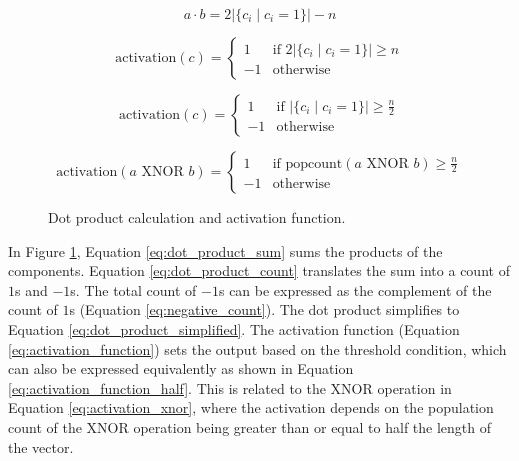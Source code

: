 \documentclass[conference]{IEEEtran}
\begin{document}
\begin{figure}[t]
    \begin{equation}
    a \cdot b = 2 \left|\{c_i \mid c_i = 1\}\right| - n
    \label{eq:dot_product_simplified}
    \end{equation}

    \begin{equation}
    \text{activation}(c) = \begin{cases}
    1 & \text{if } 2 \left|\{c_i \mid c_i = 1\}\right| \geq n \\
    -1 & \text{otherwise}
    \end{cases}
    \label{eq:activation_function}
    \end{equation}

    \begin{equation}
    \text{activation}(c) = \begin{cases}
    1 & \text{if } \left|\{c_i \mid c_i = 1\}\right| \geq \frac{n}{2} \\
    -1 & \text{otherwise}
    \end{cases}
    \label{eq:activation_function_half}
    \end{equation}

    \begin{equation}
    \text{activation}(a \text{ XNOR } b) = \begin{cases}
    1 & \text{if } \text{popcount}(a \text{ XNOR } b) \geq \frac{n}{2} \\
    -1 & \text{otherwise}
    \end{cases}
    \label{eq:activation_xnor}
    \end{equation}

    \caption{Dot product calculation and activation function.}
    \label{fig:dot_product_activation}
\end{figure}

In Figure \ref{fig:dot_product_activation}, Equation \ref{eq:dot_product_sum} sums the products of the components. Equation \ref{eq:dot_product_count} translates the sum into a count of \(1\)s and \(-1\)s. The total count of \(-1\)s can be expressed as the complement of the count of \(1\)s (Equation \ref{eq:negative_count}). The dot product simplifies to Equation \ref{eq:dot_product_simplified}. The activation function (Equation \ref{eq:activation_function}) sets the output based on the threshold condition, which can also be expressed equivalently as shown in Equation \ref{eq:activation_function_half}. This is related to the XNOR operation in Equation \ref{eq:activation_xnor}, where the activation depends on the population count of the XNOR operation being greater than or equal to half the length of the vector.
\end{document}
